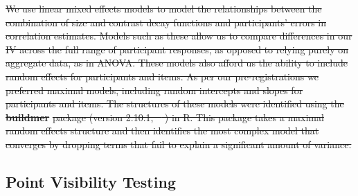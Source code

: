 \documentclass[manuscript, review, anonymous, screen]{acmart}
\providecommand{\DIFdeltex}[1]{{\protect\color{red}\sout{#1}}}                      %
\providecommand{\DIFdelend}{} %
\providecommand{\DIFdel}[1]{\texorpdfstring{\DIFdeltex{#1}}{}} %
\DeclareRobustCommand{\DIFdelend}{\DIFOaddend \let\includegraphics\DIFOincludegraphics} %
\begin{document}
\DIFdel{We use linear mixed effects models to model the relationships between
the combination of size and contrast decay functions and participants'
errors in correlation estimates. Models such as these allow us to
compare differences in our IV across the full range of participant
responses, as opposed to relying purely on aggregate data, as in ANOVA.
These models also afford us the ability to include random effects for
participants and items. As per our pre-registrations we preferred
maximal models, including random intercepts and slopes for participants
and items. The structures of these models were identified using the
}\textbf{\DIFdel{buildmer}} %
\DIFdel{package (version 2.10.1, \mbox{%
\citep{voeten_buildmer}}\hskip0pt%
) in
R. This package takes a maximal random effects structure and then
identifies the most complex model that converges by dropping terms that
fail to explain a significant amount of variance.
}%

\DIFdelend \hypertarget{sec-VT}{%
\subsection{Point Visibility Testing}\label{sec-VT}}
\end{document}
